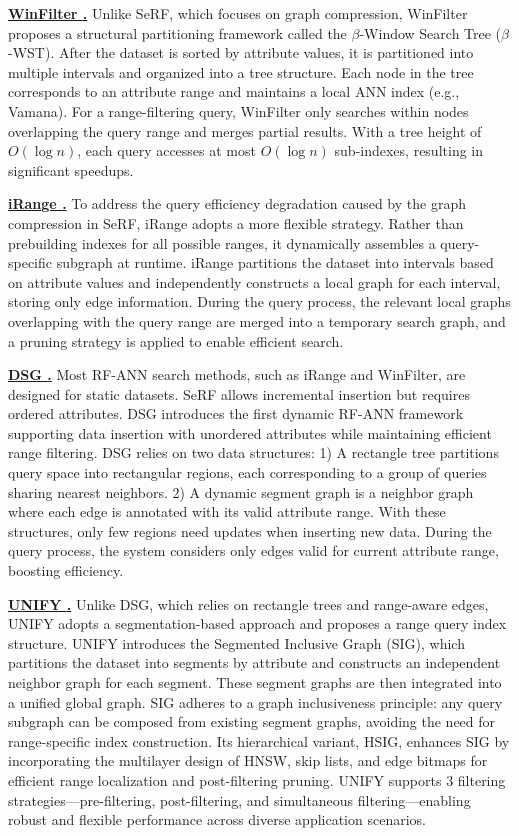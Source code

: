 \documentclass[sigconf, nonacm]{acmart}
\begin{document}
\noindent\textbf{\underline{WinFilter \cite{winFilter}.}}  
Unlike SeRF, which focuses on graph compression, WinFilter proposes a structural partitioning framework called the $\beta$-Window Search Tree ($\beta$-WST). After the dataset is sorted by attribute values, it is partitioned into multiple intervals and organized into a tree structure. Each node in the tree corresponds to an attribute range and maintains a local ANN index (e.g., Vamana). For a range-filtering query, WinFilter only searches within nodes overlapping the query range and merges partial results. With a tree height of $O(\log n)$, each query accesses at most $O(\log n)$ sub-indexes, resulting in significant speedups.

\noindent\textbf{\underline{iRange \cite{iRangeGraph}.}}  
To address the query efficiency degradation caused by the graph compression in SeRF, iRange adopts a more flexible strategy. Rather than prebuilding indexes for all possible ranges, it dynamically assembles a query-specific subgraph at runtime. iRange partitions the dataset into intervals based on attribute values and independently constructs a local graph for each interval, storing only edge information. During the query process, the relevant local graphs overlapping with the query range are merged into a temporary search graph, and a pruning strategy is applied to enable efficient search.

\noindent\textbf{\underline{DSG \cite{DSG}.}}   
Most RF-ANN search methods, such as iRange and WinFilter, are designed for static datasets. SeRF allows incremental insertion but requires ordered attributes. DSG introduces the first dynamic RF-ANN framework supporting data insertion with unordered attributes while maintaining efficient range filtering.
DSG relies on two data structures: 1) A rectangle tree partitions query space into rectangular regions, each corresponding to a group of queries sharing nearest neighbors. 2) A dynamic segment graph is a neighbor graph where each edge is annotated with its valid attribute range.
With these structures, only few regions need updates when inserting new data. During the query process, the system considers only edges valid for current attribute range, boosting efficiency.

\noindent\textbf{\underline{UNIFY \cite{UNIFY}.}}  
Unlike DSG, which relies on rectangle trees and range-aware edges, UNIFY adopts a segmentation-based approach and proposes a range query index structure. UNIFY introduces the Segmented Inclusive Graph (SIG), which partitions the dataset into segments by attribute and constructs an independent neighbor graph for each segment. These segment graphs are then integrated into a unified global graph. SIG adheres to a graph inclusiveness principle: any query subgraph can be composed from existing segment graphs, avoiding the need for range-specific index construction. Its hierarchical variant, HSIG, enhances SIG by incorporating the multilayer design of HNSW, skip lists, and edge bitmaps for efficient range localization and post-filtering pruning. UNIFY supports 3 filtering strategies—pre-filtering, post-filtering, and  simultaneous filtering—enabling robust and flexible performance across diverse application scenarios.
\end{document}
